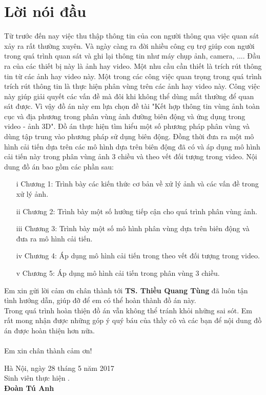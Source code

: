 \documentclass[12pt, oneside, a4paper]{book}
\begin{document}
%
\chapter*{Lời nói đầu}
Từ trước đến nay việc thu thập thông tin của con người thông qua việc quan sát xảy ra rất thường xuyên. Và ngày càng ra đời nhiều công cụ trợ giúp con người trong quá trình quan sát và ghi lại thông tin như máy chụp ảnh, camera, .... Đầu ra của các thiết bị này là ảnh hay video. Một nhu cầu cần thiết là trích rút thông tin từ các ảnh hay video này. Một trong các công việc quan trọng trong quá trình trích rút thông tin là thực hiện phân vùng trên các ảnh hay video này. Công việc này giúp giải quyết các vấn đề mà đôi khi không thể dùng mắt thường để quan sát được. Vì vậy đồ án này em lựa chọn đề tài "Kết hợp thông tin vùng ảnh toàn cục và địa phương trong phân vùng ảnh
đường biên động và ứng dụng trong video - ảnh 3D".  Đồ án thực hiện tìm hiểu một số phương pháp phân vùng và dùng tập trung vào phương pháp sử dụng biên động. Đồng thời đưa ra một mô hình cải tiến dựa trên các mô hình dựa trên biên động đã có và áp dụng mô hình cải tiến này trong phân vùng ảnh 3 chiều và  theo vết đối tượng trong video. Nội dung đồ án bao gồm  các phần sau:
\begin{itemize}
\item[i] Chương 1: Trình bày các kiến thức cơ bản về xử lý ảnh và các vấn đề trong xử lý ảnh.
\item[ii] Chương 2: Trình bày một số hướng tiếp cận cho quá trình phân vùng ảnh.
\item[iii] Chương 3: Trình bày một số mô hình phân vùng dựa trên biên động và đưa ra mô hình cải tiến.
\item[iv] Chương 4: Áp dụng mô hình cải tiến trong theo vết đối tượng trong video.
\item[v] Chương 5: Áp dụng mô hình cải tiến trong phân vùng 3 chiều.
\end{itemize}
 Em xin gửi lời cảm ơn chân thành  tới {\bf TS. Thiều Quang Tùng} đã luôn tận tình hướng dẫn, giúp đỡ để em có thể hoàn thành đồ án này.\\
Trong quá trình hoàn thiện đồ án vẫn không thể tránh khỏi những sai sót. Em rất mong nhận được những góp ý quý báu của thầy cô và các bạn để nội dung đồ án được hoàn thiện hơn nữa.\\\\
Em xin chân thành cảm ơn!\\


\begin{flushright}
Hà Nội, ngày 28 tháng 5 năm 2017\\[0.5cm]
{Sinh viên thực hiện \hspace*{1.4cm}.}\\[0.1cm]
\textbf{Đoàn Tú Anh\hspace*{2.0cm}}
\end{flushright}
\tableofcontents
\newpage
\listoffigures
\newpage
\newpage
\end{document}
